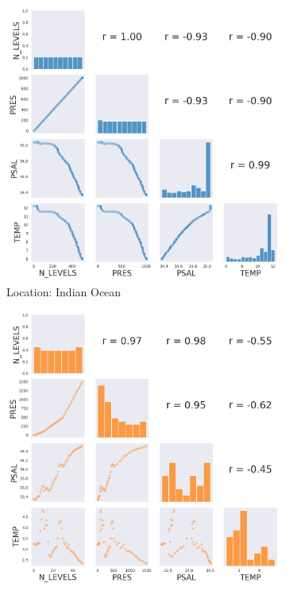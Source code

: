 \documentclass[12pt]{article}
\begin{document}
    \begin{figure}
        \centering
        \begin{subfigure}{.5\textwidth}
            \centering
            \includegraphics[width=1\textwidth]{correlation1.png}
        \caption{Location: Indian Ocean}
        \end{subfigure}%
        \begin{subfigure}{.5\textwidth}
            \centering
            \includegraphics[width=1\textwidth]{correlation2.png}

\end{subfigure}
\end{figure}
\end{document}
